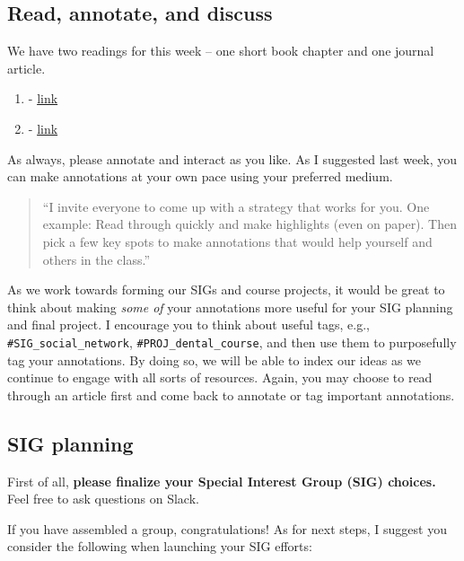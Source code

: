\documentclass[
]{book}
\providecommand{\tightlist}{%
  \setlength{\itemsep}{0pt}\setlength{\parskip}{0pt}}
\begin{document}
\hypertarget{read-annotate-and-discuss}{%
\subsection{Read, annotate, and discuss}\label{read-annotate-and-discuss}}

We have two readings for this week -- one short book chapter and one journal article.

\begin{enumerate}
\def\labelenumi{\arabic{enumi}.}
\tightlist
\item
  \citet{knight2017theory} - \href{https://solaresearch.org/wp-content/uploads/2017/05/chapter1.pdf}{link}
\item
  \citet{perrotta2018social} - \href{https://www.tandfonline.com/doi/pdf/10.1080/17439884.2016.1182927?needAccess=true}{link}
\end{enumerate}

As always, please annotate and interact as you like. As I suggested last week, you can make annotations at your own pace using your preferred medium.

\begin{quote}
``I invite everyone to come up with a strategy that works for you. One example: Read through quickly and make highlights (even on paper). Then pick a few key spots to make annotations that would help yourself and others in the class.''
\end{quote}

As we work towards forming our SIGs and course projects, it would be great to think about making \emph{some of} your annotations more useful for your SIG planning and final project. I encourage you to think about useful tags, e.g., \texttt{\#SIG\_social\_network}, \texttt{\#PROJ\_dental\_course}, and then use them to purposefully tag your annotations. By doing so, we will be able to index our ideas as we continue to engage with all sorts of resources. Again, you may choose to read through an article first and come back to annotate or tag important annotations.

\hypertarget{sig-planning}{%
\subsection{SIG planning}\label{sig-planning}}

First of all, \textbf{please finalize your Special Interest Group (SIG) choices.} Feel free to ask questions on Slack.

If you have assembled a group, congratulations! As for next steps, I suggest you consider the following when launching your SIG efforts:
\end{document}
